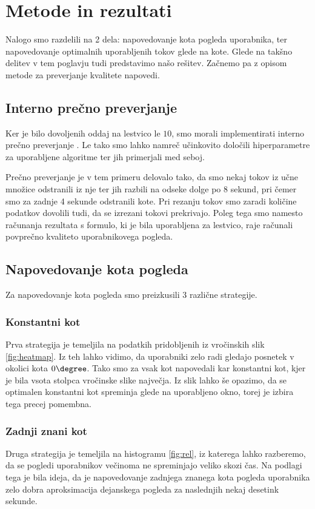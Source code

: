 \section{Metode in rezultati} 

Nalogo smo razdelili na 2 dela: napovedovanje kota pogleda uporabnika, ter
napovedovanje optimalnih uporabljenih tokov glede na kote. Glede na takšno
delitev v tem poglavju tudi predstavimo našo rešitev. Začnemo pa z opisom
metode za preverjanje kvalitete napovedi.

\subsection{Interno prečno preverjanje}
Ker je bilo dovoljenih oddaj na lestvico le $10$, smo morali implementirati
interno prečno preverjanje . Le tako smo lahko namreč
učinkovito določili hiperparametre za uporabljene algoritme ter jih primerjali
med seboj.

Prečno preverjanje je v tem primeru delovalo tako, da smo nekaj tokov iz učne
množice odstranili iz nje ter jih razbili na odseke dolge po 8 sekund, pri
čemer smo za zadnje 4 sekunde odstranili kote. Pri rezanju tokov smo zaradi
količine podatkov dovolili tudi, da se izrezani tokovi prekrivajo.  Poleg tega
smo namesto računanja rezultata s formulo, ki je bila uporabljena za lestvico,
raje računali povprečno kvaliteto uporabnikovega pogleda.

\subsection{Napovedovanje kota pogleda}

Za napovedovanje kota pogleda smo preizkusili 3 različne strategije.

\subsubsection{Konstantni kot}
Prva strategija je temeljila na podatkih pridobljenih iz vročinskih slik
\ref{fig:heatmap}. Iz teh lahko vidimo, da uporabniki zelo radi gledajo
posnetek v okolici kota $0\degree$. Tako smo za vsak kot napovedali kar
konstantni kot, kjer je bila vsota stolpca vročinske slike največja. Iz slik
lahko še opazimo, da se optimalen konstantni kot spreminja glede na uporabljeno
okno, torej je izbira tega precej pomembna.

\subsubsection{Zadnji znani kot}
Druga strategija je temeljila na histogramu \ref{fig:rel}, iz
katerega lahko razberemo, da se pogledi uporabnikov večinoma ne spreminjajo
veliko skozi čas. Na podlagi tega je bila ideja, da je napovedovanje zadnjega
znanega kota pogleda uporabnika zelo dobra aproksimacija dejanskega pogleda za
naslednjih nekaj desetink sekunde.

